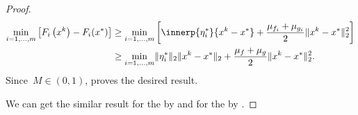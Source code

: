 \documentclass[../../main]{subfiles}
\begin{document}
\begin{proof}
\begin{equation}
        \begin{aligned}
            \min_{i = 1, \dots, m} \left[ F_i\left(x^k\right) - F_i(x^*) \right] &\ge \min_{i = 1, \dots, m} \left[  \innerp{\eta_i^*}{x^k - x^*} + \frac{\mu_{f_i} + \mu_{g_i}}{2} \norm{x^k - x^*}_2^2 \right] \\
                                                                      &\ge \min_{i = 1, \dots, m} \norm{\eta_i^*}_2 \norm{x^k - x^*}_2 + \frac{\mu_f + \mu_g}{2} \norm{x^k - x^*}_2^2
        .\end{aligned}
    \end{equation}
    Since~$M \in (0, 1)$,  proves the desired result.

    We can get the similar result for the  by  and for the  by .
\end{proof}
\end{document}

